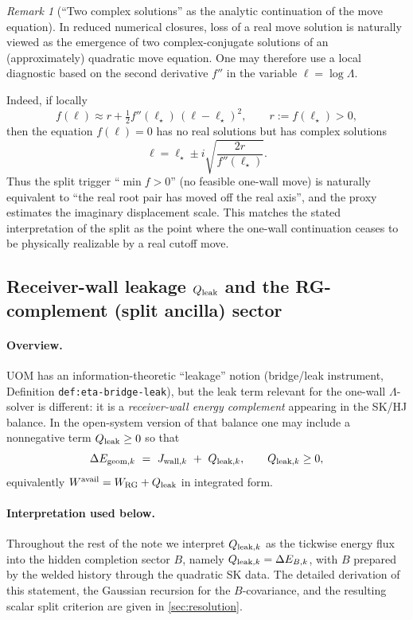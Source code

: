 \documentclass[11pt]{article}
\theoremstyle{definition}
\theoremstyle{plain}
\theoremstyle{remark}
\newtheorem{remark}[definition]{Remark}
\begin{document}
\begin{remark}[``Two complex solutions'' as the analytic continuation of the move equation]
In reduced numerical closures, loss of a real move solution is naturally viewed as the emergence of two
complex-conjugate solutions of an (approximately) quadratic move equation.
One may therefore use a local diagnostic based on the second derivative \(f''\) in the variable \(\ell=\log\Lambda\).

Indeed, if locally
\[
f(\ell)\approx r+\tfrac12 f''(\ell_\star)\,(\ell-\ell_\star)^2,\qquad r:=f(\ell_\star)>0,
\]
then the equation $f(\ell)=0$ has no real solutions but has complex solutions
\[
\ell=\ell_\star\pm i\sqrt{\frac{2r}{f''(\ell_\star)}}.
\]
Thus the split trigger ``$\min f>0$'' (no feasible one-wall move) is naturally equivalent to ``the real root pair has moved
off the real axis'', and the proxy estimates the imaginary displacement scale. This matches the stated interpretation of
the split as the point where the one-wall continuation ceases to be physically realizable by a real cutoff move.
\end{remark}

\subsection{Receiver-wall leakage $Q_{\rm leak}$ and the RG-complement (split ancilla) sector}
\label{subsec:leak-theory}

\paragraph{Overview.}
UOM has an information-theoretic ``leakage'' notion (bridge/leak instrument, Definition \texttt{def:eta-bridge-leak}), but
the leak term relevant for the one-wall \(\Lambda\)-solver is different: it is a \emph{receiver-wall energy complement}
appearing in the SK/HJ balance.
In the open-system version of that balance one may include a nonnegative term \(Q_{\rm leak}\ge 0\) so that
\begin{equation}
\Delta E_{{\rm geom},k}\ =\ J_{{\rm wall},k}\ +\ Q_{{\rm leak},k},
\qquad Q_{{\rm leak},k}\ge 0,
\label{eq:wall-leak-balance}
\end{equation}
equivalently \(W^{\rm avail}=W_{\rm RG}+Q_{\rm leak}\) in integrated form.

\paragraph{Interpretation used below.}
Throughout the rest of the note we interpret \(Q_{{\rm leak},k}\) as the tickwise energy flux into the hidden completion
sector \(B\), namely \(Q_{{\rm leak},k}=\Delta E_{B,k}\), with \(B\) prepared by the welded history through the quadratic
SK data.
The detailed derivation of this statement, the Gaussian recursion for the \(B\)-covariance, and the resulting scalar split
criterion are given in \cref{sec:resolution}.
\end{document}
